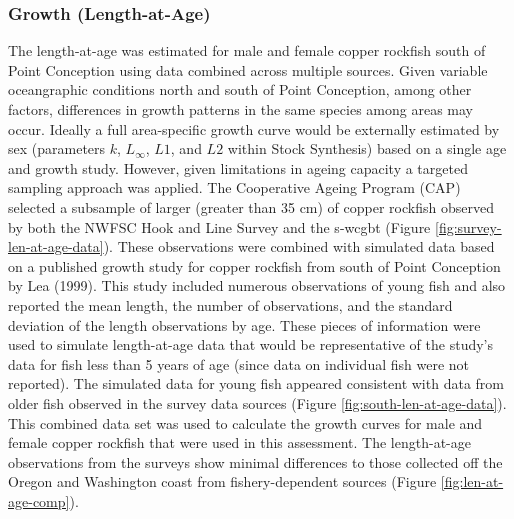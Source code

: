 \documentclass[11pt,
  english,
  a4paper,
]{article}
\begin{document}
\leavevmode\tagmcend\tagstructend\par


\hypertarget{growth-length-at-age}{%
\subsubsection{Growth (Length-at-Age)}\label{growth-length-at-age}}

\leavevmode\tagmcend\tagstructend


The length-at-age was estimated for male and female copper rockfish south of Point Conception using data combined across multiple sources. Given variable oceangraphic conditions north and south of Point Conception, among other factors, differences in growth patterns in the same species among areas may occur. Ideally a full area-specific growth curve would be externally estimated by sex (parameters {\(k\)\leavevmode\tagmcend\tagstructend}, {\(L_{\infty}\)\leavevmode\tagmcend\tagstructend}, {\(L1\)\leavevmode\tagmcend\tagstructend}, and {\(L2\)\leavevmode\tagmcend\tagstructend} within Stock Synthesis) based on a single age and growth study. However, given limitations in ageing capacity a targeted sampling approach was applied. The Cooperative Ageing Program (CAP) selected a subsample of larger (greater than 35 cm) of copper rockfish observed by both the NWFSC Hook and Line Survey and the \Gls{s-wcgbt} (Figure \ref{fig:survey-len-at-age-data}). These observations were combined with simulated data based on a published growth study for copper rockfish from south of Point Conception by Lea {(1999)\leavevmode\tagmcend\tagstructend}. This study included numerous observations of young fish and also reported the mean length, the number of observations, and the standard deviation of the length observations by age. These pieces of information were used to simulate length-at-age data that would be representative of the study's data for fish less than 5 years of age (since data on individual fish were not reported). The simulated data for young fish appeared consistent with data from older fish observed in the survey data sources (Figure \ref{fig:south-len-at-age-data}). This combined data set was used to calculate the growth curves for male and female copper rockfish that were used in this assessment. The length-at-age observations from the surveys show minimal differences to those collected off the Oregon and Washington coast from fishery-dependent sources (Figure \ref{fig:len-at-age-comp}).
\end{document}

